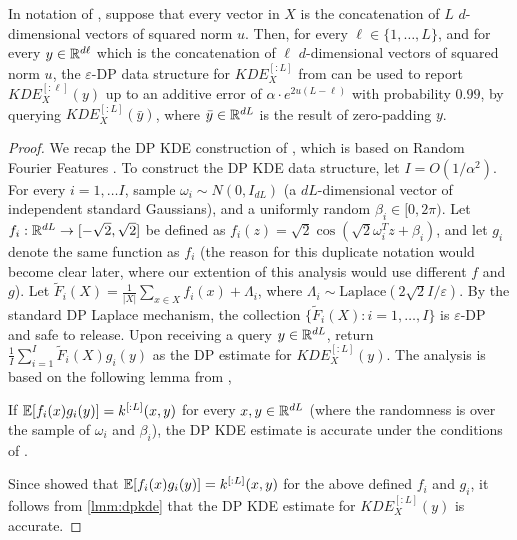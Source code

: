 \begin{theorem}\label{thm:ensemblekde}
 In notation of , suppose that every vector in $X$ is the concatenation of $L$ $d$-dimensional vectors of squared norm $u$. Then, for every $\ell\in\{1,\ldots,L\}$, and for every $y\in\mathbb R^{d\ell}$ which is the concatenation of $\ell$ $d$-dimensional vectors of squared norm $u$, the $\varepsilon$-DP data structure for $KDE^{[:L]}_X$ from  can be used to report $KDE^{[:\ell]}_X(y)$ up to an additive error of $\alpha\cdot e^{2u(L-\ell)}$ with probability $0.99$, by querying $KDE^{[:L]}_X(\bar y)$, where $\bar y\in\mathbb R^{dL}$ is the result of zero-padding $y$. 
\end{theorem}
\begin{proof}
We recap the DP KDE construction of \cite{wagner2023fast}, which is based on Random Fourier Features \cite{rahimi2007random}. 
To construct the DP KDE data structure,
let $I=O(1/\alpha^2)$. For every $i=1,\ldots I$, 
sample $\omega_i\sim N(0,I_{dL})$ (a $dL$-dimensional vector of independent standard Gaussians), and a uniformly random $\beta_i\in[0,2\pi)$. Let $f_i:\mathbb R^{dL}\rightarrow[-\sqrt{2},\sqrt{2}]$ be defined as $f_i(z)=\sqrt{2}\cos(\sqrt{2}\omega_i^Tz+\beta_i)$, and let $g_i$ denote the same function as $f_i$ (the reason for this duplicate notation would become clear later, where our extention of this analysis would use different $f$ and $g$). Let $\tilde F_i(X)=\frac{1}{|X|}\sum_{x\in X}f_i(x)+\Lambda_i$, where $\Lambda_i\sim\mathrm{Laplace}(2\sqrt{2}I/\varepsilon)$. 
By the standard DP Laplace mechanism, the collection $\{\tilde F_i(X):i=1,\ldots,I\}$ is $\varepsilon$-DP and safe to release. 
Upon receiving a query $y\in\mathbb R^{dL}$, return $\frac{1}{I}\sum_{i=1}^I\tilde F_i(X)g_i(y)$ as the DP estimate for $KDE_{X}^{[:L]}(y)$. The analysis is based on the following lemma from \cite{wagner2023fast},
\begin{lemma}\label{lmm:dpkde}
If $\mathbb E[f_i(x)g_i(y)]=k^{[:L]}(x,y)$ for every $x,y\in\mathbb R^{dL}$ (where the randomness is over the sample of $\omega_i$ and $\beta_i$), the DP KDE estimate is accurate under the conditions of .
\end{lemma}
Since \cite{rahimi2007random} showed that $\mathbb E[f_i(x)g_i(y)]=k^{[:L]}(x,y)$ for the above defined $f_i$ and $g_i$, it follows from \cref{lmm:dpkde} that the DP KDE estimate for $KDE_X^{[:L]}(y)$ is accurate.


\end{proof}
